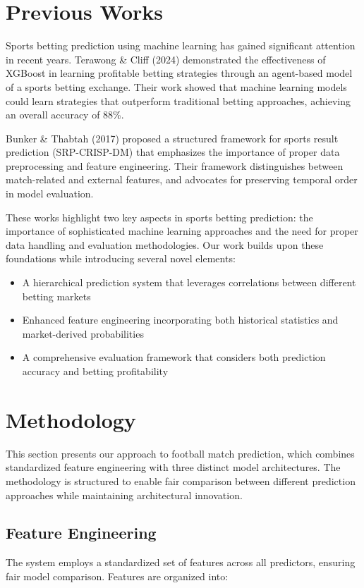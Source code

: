 \documentclass[conference]{IEEEtran}
\begin{document}
\section{Previous Works}
Sports betting prediction using machine learning has gained significant attention in recent years. Terawong \& Cliff (2024) demonstrated the effectiveness of XGBoost in learning profitable betting strategies through an agent-based model of a sports betting exchange. Their work showed that machine learning models could learn strategies that outperform traditional betting approaches, achieving an overall accuracy of 88\%.

Bunker \& Thabtah (2017) proposed a structured framework for sports result prediction (SRP-CRISP-DM) that emphasizes the importance of proper data preprocessing and feature engineering. Their framework distinguishes between match-related and external features, and advocates for preserving temporal order in model evaluation.

These works highlight two key aspects in sports betting prediction: the importance of sophisticated machine learning approaches and the need for proper data handling and evaluation methodologies. Our work builds upon these foundations while introducing several novel elements:

\begin{itemize}
    \item A hierarchical prediction system that leverages correlations between different betting markets
    \item Enhanced feature engineering incorporating both historical statistics and market-derived probabilities
    \item A comprehensive evaluation framework that considers both prediction accuracy and betting profitability
\end{itemize}

\section{Methodology}
This section presents our approach to football match prediction, which combines standardized feature engineering with three distinct model architectures. The methodology is structured to enable fair comparison between different prediction approaches while maintaining architectural innovation.

\subsection{Feature Engineering}
The system employs a standardized set of features across all predictors, ensuring fair model comparison. Features are organized into:
\end{document}
